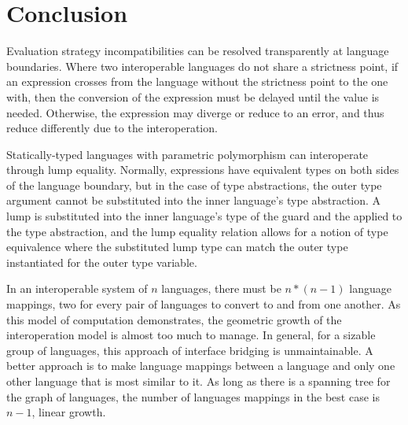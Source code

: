 \section{Conclusion}

Evaluation strategy incompatibilities can be resolved transparently at language boundaries. Where two interoperable languages do not share a strictness point, if an expression crosses from the language without the strictness point to the one with, then the conversion of the expression must be delayed until the value is needed. Otherwise, the expression may diverge or reduce to an error, and thus reduce differently due to the interoperation.

Statically-typed languages with parametric polymorphism can interoperate through lump equality. Normally, expressions have equivalent types on both sides of the language boundary, but in the case of type abstractions, the outer type argument cannot be substituted into the inner language's type abstraction. A lump is substituted into the inner language's type of the guard and the applied to the type abstraction, and the lump equality relation allows for a notion of type equivalence where the substituted lump type can match the outer type instantiated for the outer type variable.

In an interoperable system of $n$ languages, there must be $n * (n - 1)$ language mappings, two for every pair of languages to convert to and from one another. As this model of computation demonstrates, the geometric growth of the interoperation model is almost too much to manage. In general, for a sizable group of languages, this approach of interface bridging is unmaintainable. A better approach is to make language mappings between a language and only one other language that is most similar to it. As long as there is a spanning tree for the graph of languages, the number of languages mappings in the best case is $n - 1$, linear growth.